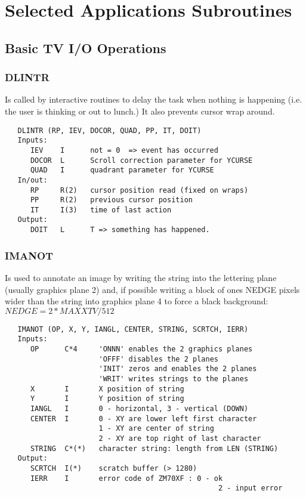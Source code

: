 \section{Selected Applications Subroutines}

\subsection{Basic TV I/O Operations}

\subsubsection{DLINTR}
Is called by interactive routines to delay the task when
nothing is happening (i.e. the user is thinking or out to lunch.)
It also prevents cursor wrap around.
\begin{verbatim}
   DLINTR (RP, IEV, DOCOR, QUAD, PP, IT, DOIT)
   Inputs:
      IEV    I      not = 0  => event has occurred
      DOCOR  L      Scroll correction parameter for YCURSE
      QUAD   I      quadrant parameter for YCURSE
   In/out:
      RP     R(2)   cursor position read (fixed on wraps)
      PP     R(2)   previous cursor position
      IT     I(3)   time of last action
   Output:
      DOIT   L      T => something has happened.
\end{verbatim}

\subsubsection{IMANOT}
Is used to annotate an image by writing the string into the
lettering plane (usually graphics plane 2) and, if possible writing
a block of ones NEDGE pixels wider than the string into graphics
plane 4 to force a black background:     $NEDGE = 2 * MAXXTV / 512$
\begin{verbatim}
   IMANOT (OP, X, Y, IANGL, CENTER, STRING, SCRTCH, IERR)
   Inputs:
      OP      C*4     'ONNN' enables the 2 graphics planes
                      'OFFF' disables the 2 planes
                      'INIT' zeros and enables the 2 planes
                      'WRIT' writes strings to the planes
      X       I       X position of string
      Y       I       Y position of string
      IANGL   I       0 - horizontal, 3 - vertical (DOWN)
      CENTER  I       0 - XY are lower left first character
                      1 - XY are center of string
                      2 - XY are top right of last character
      STRING  C*(*)   character string: length from LEN (STRING)
   Output:
      SCRTCH  I(*)    scratch buffer (> 1280)
      IERR    I       error code of ZM70XF : 0 - ok
                                                  2 - input error
\end{verbatim}

